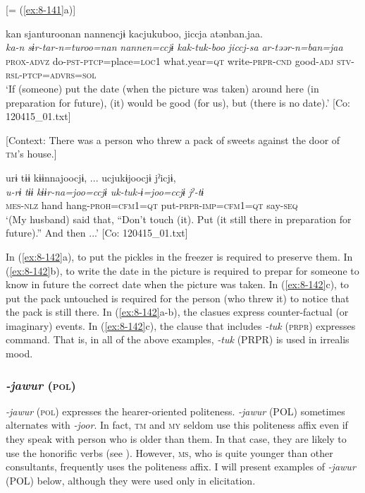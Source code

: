 \ex{} [= (\ref{ex:8-141}a)]

{\TM}
\glll  kan  sjanturoonan  {\textbar}nannen{\textbar}cjɨ  kacjukuboo,     jiccja  atənban.jaa.  \\
\textit{ka-n}  \textit{sɨr-tar-n=turoo=nan}  \textit{nannen=ccjɨ}  \textit{kak-tuk-boo}      \textit{jiccj-sa}  \textit{ar-təər-n=ban=jaa}  \\
\textsc{prox}-\textsc{advz}  do-\textsc{pst}-\textsc{ptcp}=place=\textsc{loc1}  what.year=\textsc{qt}  write-\textsc{prpr}-\textsc{cnd}  good-\textsc{adj}  \textsc{stv}-\textsc{rsl}-\textsc{ptcp}=\textsc{advrs}=\textsc{sol}\\
\glt ‘If (someone) put the date (when the picture was taken) around here (in preparation for future), (it) would be good (for us), but (there is no date).’ [Co: 120415\_01.txt]

\ex {}[Context: There was a person who threw a pack of sweets against the door of \textsc{tm}’s house.]

{\TM}
\glll  urɨ  tɨɨ  kɨɨnnajoocjɨ, ...  ucjukɨjoocjɨ      jˀicjɨ,      \\
\textit{u-rɨ}  \textit{tɨɨ}  \textit{kɨɨr-na=joo=ccjɨ}  \textit{uk-tuk-ɨ=joo=ccjɨ}     \textit{jˀ-tɨ}      \\
\textsc{mes}-\textsc{nlz}  hand  hang-\textsc{proh}=\textsc{cfm1}=\textsc{qt}  put-\textsc{prpr}-\textsc{imp}=\textsc{cfm1}=\textsc{qt}  say-\textsc{seq}\\
\glt ‘(My husband) said that, “Don’t touch (it). Put (it still there in preparation for future).” And then ...’ [Co: 120415\_01.txt]
\z
\z

In (\ref{ex:8-142}a), to put the pickles in the freezer is required to preserve them. In (\ref{ex:8-142}b), to write the date in the picture is required to prepar for someone to know in future the correct date when the picture was taken. In (\ref{ex:8-142}c), to put the pack untouched is required for the person (who threw it) to notice that the pack is still there. In (\ref{ex:8-142}a-b), the clasues express counter-factual (or imaginary) events. In (\ref{ex:8-142}c), the clause that includes \textit{-tuk} (\textsc{prpr}) expresses command. That is, in all of the above examples, \textit{-tuk} (PRPR) is used in irrealis mood.

\subsubsection{\textit{-jawur} (\textsc{pol})}

\textit{-jawur} (\textsc{pol}) expresses the hearer-oriented politeness. \textit{-jawur} (POL) sometimes alternates with \textit{-joor}. In fact, \textsc{tm} and \textsc{my} seldom use this politeness affix even if they speak with person who is older than them. In that case, they are likely to use the honorific verbs (see ). However, \textsc{ms}, who is quite younger than other consultants, frequently uses the politeness affix. I will present examples of \textit{-jawur} (POL) below, although they were used only in elicitation.

